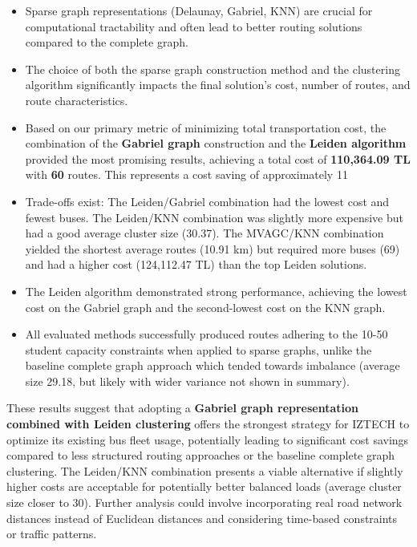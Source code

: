 \begin{itemize}
    \item Sparse graph representations (Delaunay, Gabriel, KNN) are crucial for computational tractability and often lead to better routing solutions compared to the complete graph.
    \item The choice of both the sparse graph construction method and the clustering algorithm significantly impacts the final solution's cost, number of routes, and route characteristics.
    \item Based on our primary metric of minimizing total transportation cost, the combination of the \textbf{Gabriel graph} construction and the \textbf{Leiden algorithm} provided the most promising results, achieving a total cost of \textbf{110,364.09 TL} with \textbf{60} routes. This represents a cost saving of approximately 11%
    \item Trade-offs exist: The Leiden/Gabriel combination had the lowest cost and fewest buses. The Leiden/KNN combination was slightly more expensive but had a good average cluster size (30.37). The MVAGC/KNN combination yielded the shortest average routes (10.91 km) but required more buses (69) and had a higher cost (124,112.47 TL) than the top Leiden solutions.
    \item The Leiden algorithm demonstrated strong performance, achieving the lowest cost on the Gabriel graph and the second-lowest cost on the KNN graph.
    \item All evaluated methods successfully produced routes adhering to the 10-50 student capacity constraints when applied to sparse graphs, unlike the baseline complete graph approach which tended towards imbalance (average size 29.18, but likely with wider variance not shown in summary).
\end{itemize}

These results suggest that adopting a \textbf{Gabriel graph representation combined with Leiden clustering} offers the strongest strategy for IZTECH to optimize its existing bus fleet usage, potentially leading to significant cost savings compared to less structured routing approaches or the baseline complete graph clustering. The Leiden/KNN combination presents a viable alternative if slightly higher costs are acceptable for potentially better balanced loads (average cluster size closer to 30). Further analysis could involve incorporating real road network distances instead of Euclidean distances and considering time-based constraints or traffic patterns.


